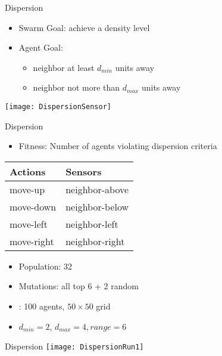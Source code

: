 \begin{slide}{Dispersion}
  \begin{itemize}
  \item Swarm Goal: achieve a density level
  \item Agent Goal: 
    \begin{itemize}
    \item neighbor at least $d_{min}$ units away
    \item neighbor not more than $d_{max}$ units away
    \end{itemize}
  \end{itemize}
  \centering
  \texttt{[image: DispersionSensor]}
\end{slide}


\begin{slide}{Dispersion}
  \begin{itemize}
  \item Fitness: Number of agents violating dispersion criteria
  \end{itemize}
  \centering
  \begin{tabular}{l|l}
    \textbf{Actions} & \textbf{Sensors} \\
    \hline
    move-up    & neighbor-above \\
    move-down  & neighbor-below \\
    move-left  & neighbor-left  \\
    move-right & neighbor-right \\
  \end{tabular}
  \begin{itemize}
  \item Population: 32
  \item Mutations: all top 6 + 2 random
  \item \SWEEP: 100 agents, $50\times50$ grid
  \item $d_{min} = 2$, $d_{max} = 4, range = 6$
  \end{itemize}
\end{slide}


\begin{slide}{Dispersion}
  \centering
  \texttt{[image: DispersionRun1]}
\end{slide}
